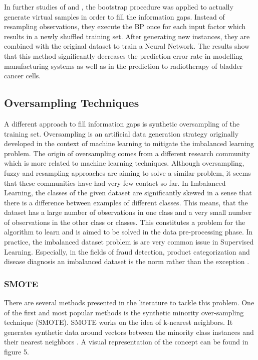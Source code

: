 \documentclass[parskip=full]{scrartcl}
\begin{document}
In further studies of \cite{Tsai.2008} and \cite{Chao.2011}, the bootstrap 
procedure was applied to actually generate virtual samples in order to fill the 
information gaps. Instead of resampling observations, they execute the BP once 
for each input factor which results in a newly shuffled training set. After 
generating new instances, they are combined with the original dataset to train 
a Neural Network. The results show that this method significantly decreases the 
prediction error rate in modelling manufacturing systems as well as in the 
prediction to radiotherapy of bladder cancer cells.

\subsection{Oversampling Techniques}

A different approach to fill information gaps is synthetic oversampling of the
training set. Oversampling is an artificial data generation strategy originally
developed in the context of machine learning to mitigate the imbalanced 
learning problem. The origin of oversampling comes from a different research 
community which is more related to machine learning techniques. Although 
oversampling, fuzzy and resampling approaches are aiming to solve a similar 
problem, it seems that these communities have had very few contact so far. In 
Imbalanced Learning, the classes of the given dataset are significantly skewed 
in a sense that there is a difference between examples of different classes. 
This means, that the dataset has a large number of observations in one class 
and a very small number of observations in the other class or classes. This 
constitutes a problem for the algorithm to learn and is aimed to be solved in 
the data pre-processing phase. In practice, the imbalanced dataset problem is 
are very common issue in Supervised Learning. Especially, in the fields of 
fraud detection, product categorization and disease diagnosis an imbalanced 
dataset is the norm rather than the exception \cite{He.2013}. 

\subsubsection{SMOTE}

There are several methods presented in the literature to tackle this problem.
One of the first and most popular methods is the synthetic minority
over-sampling technique (SMOTE). SMOTE works on the idea of k-nearest
neighbors. It generates synthetic data around vectors between the minority
class instances and their nearest neighbors \cite{Chawla.2002}. A visual
representation of the concept can be found in figure 5.
\end{document}

